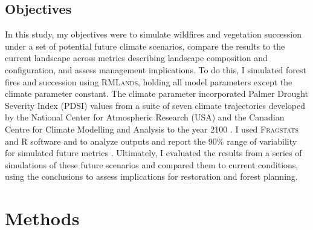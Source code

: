 \subsection*{Objectives}
In this study, my objectives were to simulate wildfires and vegetation succession under a set of potential future climate scenarios, compare the results to the current landscape across metrics describing landscape composition and configuration, and assess management implications. To do this, I simulated forest fires and succession using \textsc{RMLands}, holding all model parameters except the climate parameter constant. The climate parameter incorporated Palmer Drought Severity Index (PDSI) values from a suite of seven climate trajectories developed by the National Center for Atmospheric Research (USA) and the Canadian Centre for Climate Modelling and Analysis to the year 2100 \citep{Cook2014}. I used \textsc{Fragstats} and R software and to analyze outputs and report the 90\% range of variability for simulated future metrics \citep{Fragstats2012,RCoreTeam2013}. Ultimately, I evaluated the results from a series of simulations of these future scenarios and compared them to current conditions, using the conclusions to assess implications for restoration and forest planning.






\section{Methods}

